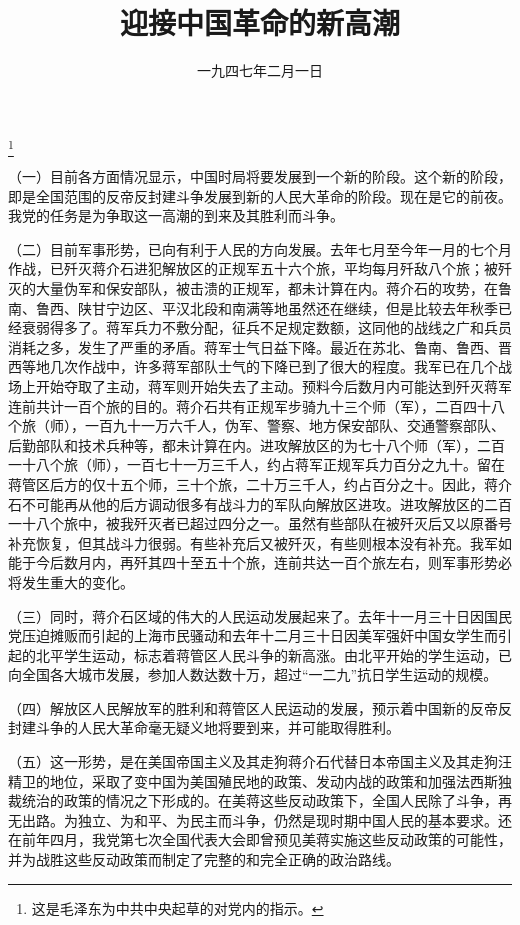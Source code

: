 
\title{迎接中国革命的新高潮}
\date{一九四七年二月一日}
\thanks{这是毛泽东为中共中央起草的对党内的指示。}
\maketitle


（一）目前各方面情况显示，中国时局将要发展到一个新的阶段。这个新的阶段，即是全国范围的反帝反封建斗争发展到新的人民大革命的阶段。现在是它的前夜。我党的任务是为争取这一高潮的到来及其胜利而斗争。

（二）目前军事形势，已向有利于人民的方向发展。去年七月至今年一月的七个月作战，已歼灭蒋介石进犯解放区的正规军五十六个旅，平均每月歼敌八个旅；被歼灭的大量伪军和保安部队，被击溃的正规军，都未计算在内。蒋介石的攻势，在鲁南、鲁西、陕甘宁边区、平汉北段和南满等地虽然还在继续，但是比较去年秋季已经衰弱得多了。蒋军兵力不敷分配，征兵不足规定数额，这同他的战线之广和兵员消耗之多，发生了严重的矛盾。蒋军士气日益下降。最近在苏北、鲁南、鲁西、晋西等地几次作战中，许多蒋军部队士气的下降已到了很大的程度。我军已在几个战场上开始夺取了主动，蒋军则开始失去了主动。预料今后数月内可能达到歼灭蒋军连前共计一百个旅的目的。蒋介石共有正规军步骑九十三个师（军），二百四十八个旅（师），一百九十一万六千人，伪军、警察、地方保安部队、交通警察部队、后勤部队和技术兵种等，都未计算在内。进攻解放区的为七十八个师（军），二百一十八个旅（师），一百七十一万三千人，约占蒋军正规军兵力百分之九十。留在蒋管区后方的仅十五个师，三十个旅，二十万三千人，约占百分之十。因此，蒋介石不可能再从他的后方调动很多有战斗力的军队向解放区进攻。进攻解放区的二百一十八个旅中，被我歼灭者已超过四分之一。虽然有些部队在被歼灭后又以原番号补充恢复，但其战斗力很弱。有些补充后又被歼灭，有些则根本没有补充。我军如能于今后数月内，再歼其四十至五十个旅，连前共达一百个旅左右，则军事形势必将发生重大的变化。

（三）同时，蒋介石区域的伟大的人民运动发展起来了。去年十一月三十日因国民党压迫摊贩而引起的上海市民骚动和去年十二月三十日因美军强奸中国女学生而引起的北平学生运动，标志着蒋管区人民斗争的新高涨。由北平开始的学生运动，已向全国各大城市发展，参加人数达数十万，超过“一二九”抗日学生运动的规模。

（四）解放区人民解放军的胜利和蒋管区人民运动的发展，预示着中国新的反帝反封建斗争的人民大革命毫无疑义地将要到来，并可能取得胜利。

（五）这一形势，是在美国帝国主义及其走狗蒋介石代替日本帝国主义及其走狗汪精卫的地位，采取了变中国为美国殖民地的政策、发动内战的政策和加强法西斯独裁统治的政策的情况之下形成的。在美蒋这些反动政策下，全国人民除了斗争，再无出路。为独立、为和平、为民主而斗争，仍然是现时期中国人民的基本要求。还在前年四月，我党第七次全国代表大会即曾预见美蒋实施这些反动政策的可能性，并为战胜这些反动政策而制定了完整的和完全正确的政治路线。

